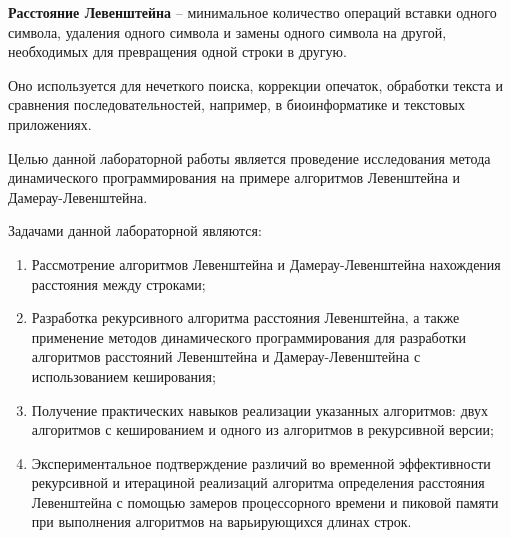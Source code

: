 
\textbf{Расстояние Левенштейна} -- минимальное количество операций вставки одного символа, удаления одного символа и замены одного символа на другой, необходимых для превращения одной строки в другую.

Оно используется для нечеткого поиска, коррекции опечаток, обработки текста и сравнения последовательностей, например, в биоинформатике и текстовых приложениях.

Целью данной лабораторной работы является проведение исследования метода динамического программирования на примере алгоритмов Левенштейна и Дамерау-Левенштейна. 

Задачами данной лабораторной являются:
\begin{enumerate}
	\item Рассмотрение алгоритмов Левенштейна и Дамерау-Левенштейна нахождения расстояния между строками;
	\item Разработка рекурсивного алгоритма расстояния Левенштейна, а также применение методов динамического программирования для разработки алгоритмов расстояний Левенштейна и Дамерау-Левенштейна с использованием кеширования; 
	\item Получение практических навыков реализации указанных алгоритмов: двух алгоритмов с кешированием и одного из алгоритмов в рекурсивной версии; 
	\item Экспериментальное подтверждение различий во временной эффективности рекурсивной и итерациной реализаций алгоритма определения расстояния Левенштейна с помощью замеров процессорного времени и пиковой памяти при выполнения алгоритмов на варьирующихся длинах строк.
\end{enumerate}
\newpage

\clearpage
